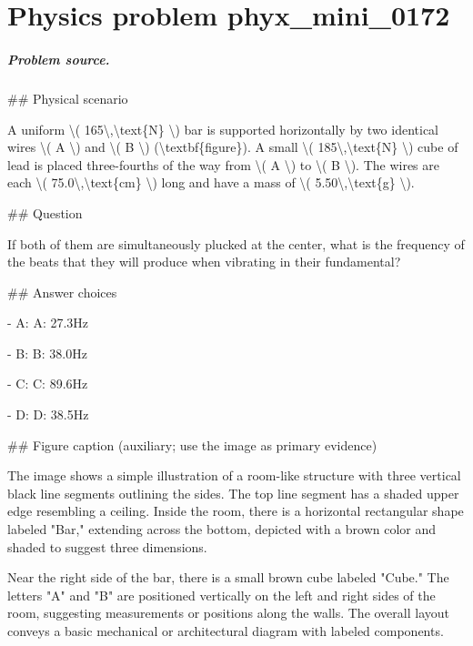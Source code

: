 
\chapter{Physics problem phyx\_mini\_0172}
\label{ch:PhyXMiniProblems_problem_phyx_mini_0172}

\paragraph{Problem source.}
\#\# Physical scenario

A uniform \textbackslash{}( 165\textbackslash{},\textbackslash{}text\{N\} \textbackslash{}) bar is supported horizontally by two identical wires \textbackslash{}( A \textbackslash{}) and \textbackslash{}( B \textbackslash{}) (\textbackslash{}textbf\{figure\}). A small \textbackslash{}( 185\textbackslash{},\textbackslash{}text\{N\} \textbackslash{}) cube of lead is placed three-fourths of the way from \textbackslash{}( A \textbackslash{}) to \textbackslash{}( B \textbackslash{}). The wires are each \textbackslash{}( 75.0\textbackslash{},\textbackslash{}text\{cm\} \textbackslash{}) long and have a mass of \textbackslash{}( 5.50\textbackslash{},\textbackslash{}text\{g\} \textbackslash{}).

\#\# Question

If both of them are simultaneously plucked at the center, what is the frequency of the beats that they will produce when vibrating in their fundamental?

\#\# Answer choices

- A: A: 27.3Hz

- B: B: 38.0Hz

- C: C: 89.6Hz

- D: D: 38.5Hz

\#\# Figure caption (auxiliary; use the image as primary evidence)

The image shows a simple illustration of a room-like structure with three vertical black line segments outlining the sides. The top line segment has a shaded upper edge resembling a ceiling. Inside the room, there is a horizontal rectangular shape labeled "Bar," extending across the bottom, depicted with a brown color and shaded to suggest three dimensions.

Near the right side of the bar, there is a small brown cube labeled "Cube." The letters "A" and "B" are positioned vertically on the left and right sides of the room, suggesting measurements or positions along the walls. The overall layout conveys a basic mechanical or architectural diagram with labeled components.

